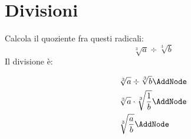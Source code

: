 \section{Divisioni}
\tcbstartrecording
\begin{exercise}
	Calcola il quoziente fra questi radicali:
	\begin{equation*}
	\sqrt[3]{a}\div\sqrt[3]{b}
	\end{equation*}
	\tcblower
	Il divisione è:
	\begin{NodesList}
		\begin{align*}
		&\sqrt[3]{a}\div\sqrt[3]{b}\AddNode\\
		&\sqrt[3]{a}\cdot\sqrt[3]{\dfrac{1}{b}}\AddNode\\
		&\sqrt[3]{\dfrac{a}{b}}\AddNode
		\end{align*}
					
				\end{NodesList}
			\end{exercise}
			
